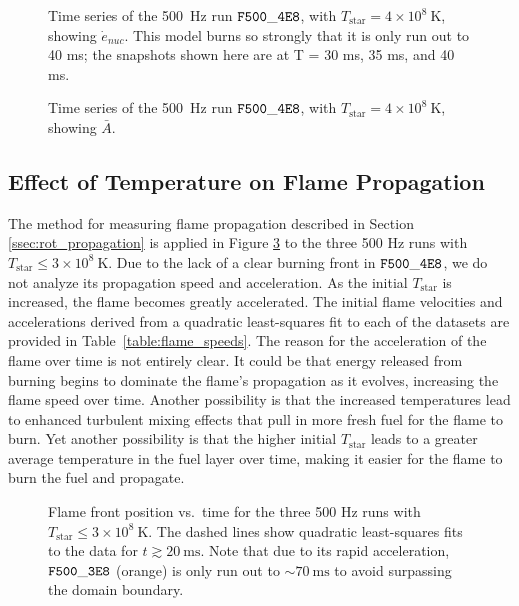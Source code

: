 \documentclass[preprint,times,tighten]{aastex63}
\begin{document}
\begin{figure}[t]
	\centering
	\caption{\label{fig:4e8_stacked_enuc} Time series of the 500~Hz run $\tt{F500\_4E8}$, with $T_{\mathrm{star}} = 4 \times 10^8~\mathrm{K}$, showing $\dot{e}_{nuc}$. This model burns so strongly that it is only run out to 40 ms; the snapshots shown here are at T = 30 ms, 35 ms, and 40 ms.}
\end{figure}

\begin{figure}[t]
	\centering
	\caption{\label{fig:4e8_stacked_abar} Time series of the 500~Hz run $\tt{F500\_4E8}$, with $T_{\mathrm{star}} = 4 \times 10^8~\mathrm{K}$, showing $\bar{A}$.}
\end{figure}


\subsection{Effect of Temperature on Flame Propagation}\label{ssec:temp_prop}

The method for measuring flame propagation described in Section \ref{ssec:rot_propagation} is applied in Figure \ref{fig:flame_speeds_2} to the three 500 Hz runs with $T_{\mathrm{star}} \leq 3 \times 10^8~\mathrm{K}$. Due to the lack of a clear burning front in $\tt{F500\_4E8}$, we do not analyze its propagation speed and acceleration. As the initial $T_{\mathrm{star}}$ is increased, the flame becomes greatly accelerated. The initial flame velocities and accelerations derived from a quadratic least-squares fit to each of the datasets are provided in Table~\ref{table:flame_speeds}. The reason for the acceleration of the flame over time is not entirely clear. It could be that energy released from burning begins to dominate the flame's propagation as it evolves, increasing the flame speed over time. Another possibility is that the increased temperatures lead to enhanced turbulent mixing effects that pull in more fresh fuel for the flame to burn. Yet another possibility is that the higher initial $T_{\mathrm{star}}$ leads to a greater average temperature in the fuel layer over time, making it easier for the flame to burn the fuel and propagate.


\begin{figure}[t]
	\centering
	\caption{\label{fig:flame_speeds_2} Flame front position vs.\ time for the three 500 Hz runs with
		$T_{\mathrm{star}} \leq 3 \times 10^8~\mathrm{K}$. The dashed lines show quadratic least-squares fits to the data
		for $t \gtrsim 20~\mathrm{ms}$. Note that due to its rapid acceleration, $\tt{F500\_3E8}$ 
		(orange) is only run out to $\sim 70~\mathrm{ms}$ to avoid surpassing the domain boundary.}
\end{figure}
\end{document}
